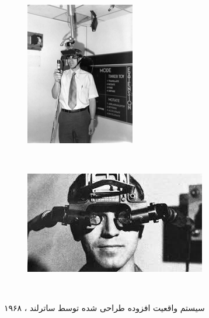 \begin{figure}
	\centering
	\begin{subfigure}[b]{0.3\textwidth}
		\includegraphics[width=\textwidth]{image/s2}
		
		\label{fig:gull}
	\end{subfigure}
	~ %
	\begin{subfigure}[b]{0.6\textwidth}
		\includegraphics[width=\textwidth]{image/s1}
		
		\label{fig:tiger}
	\end{subfigure}
	~ %
	
	\caption{سیستم واقعیت افزوده طراحی شده توسط ساترلند ، ۱۹۶۸ \cite{Sutherland2}}\label{fig:Sutherland1968}
\end{figure}

